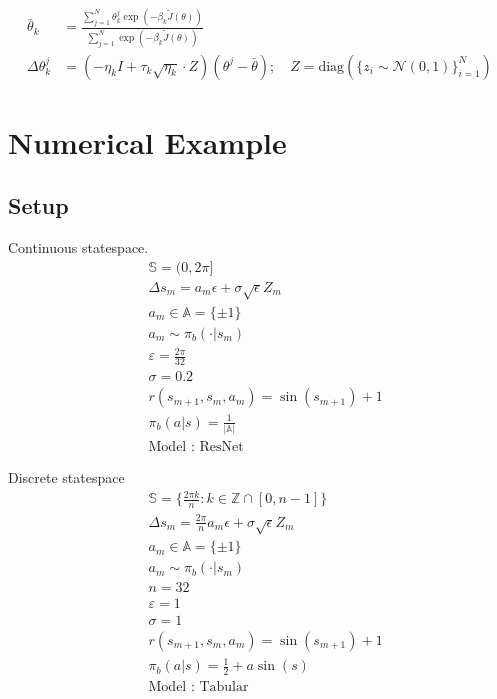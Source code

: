 \documentclass[11pt]{article}
\begin{document}
\begin{align*}
    \bar\theta_k &= \frac{\sum_{j=1}^N \theta_k^{j} \exp(-\beta_k\tilde J(\theta))}{\sum_{j=1}^N  \exp(-\beta_k\tilde J(\theta))}\\
    \Delta \theta^{j}_k &= (-\eta_k I+\tau_k\sqrt{\eta_k}\cdot Z)(\theta^j-\bar\theta); \quad Z=\text{diag}(\{z_i\sim \mathcal N(0,1)\}_{i=1}^N)
\end{align*}
\section{Numerical Example}
\subsection{Setup}
Continuous statespace.
\begin{align*}
    &\mathbb S = (0, 2\pi]\\
    &\Delta s_{m} = a_m\epsilon + \sigma \sqrt{\epsilon} Z_m\\
    &a_m \in\mathbb A = \{\pm 1\}\\
    &a_m\sim \pi_b(\cdot|s_m)\\
    &\varepsilon = \tfrac{2\pi}{32}\\
    &\sigma = 0.2\\
    &r(s_{m+1},s_{m},a_m) = \sin(s_{m+1})+1\\
    &\pi_b(a|s)=\tfrac{1}{|\mathbb A|}\\
    &\text{Model : ResNet}
\end{align*}


Discrete statespace
\begin{align*}
    &\mathbb S = \{\tfrac{2\pi k }{n}: k\in \mathbb Z \cap [0,n-1]\}\\
    &\Delta s_{m} = \tfrac{2\pi}{n}a_m\epsilon + \sigma \sqrt{\epsilon} Z_m\\
    &a_m \in\mathbb A = \{\pm 1\}\\
    &a_m\sim \pi_b(\cdot|s_m)\\
    & n=32\\
    &\varepsilon = 1\\
    &\sigma = 1\\
    &r(s_{m+1},s_{m},a_m) = \sin(s_{m+1})+1\\
    &\pi_b(a|s)=\tfrac{1}{2}+ a\sin(s)\\
    &\text{Model : Tabular}
\end{align*}
\end{document}
